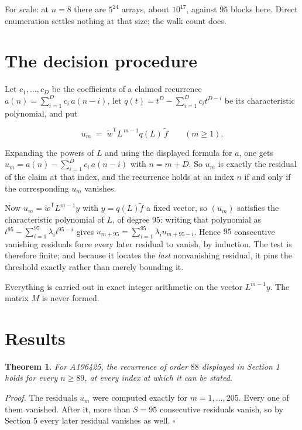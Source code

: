 \documentclass[11pt]{article}
\newtheorem{theorem}{Theorem}
\theoremstyle{definition}
\begin{document}
For scale: at $n = 8$ there are $5^{24}$ arrays, about $10^{17}$, against $95$ blocks here. Direct enumeration settles nothing at that size; the walk count does.

\section{The decision procedure}

Let $c_1,\dots,c_D$ be the coefficients of a claimed recurrence $a(n) = \sum_{i=1}^{D} c_i\,a(n-i)$, let $q(t) = t^{D} - \sum_{i=1}^{D} c_i t^{D-i}$ be its characteristic polynomial, and put

\[u_m \;=\; \tilde w^{\mathsf T} L^{\,m-1} q(L)\,\tilde f \qquad (m \ge 1).\]

Expanding the powers of $L$ and using the displayed formula for $a$, one gets $u_m = a(n) - \sum_{i=1}^{D} c_i\,a(n-i)$ with $n = m + D$. So $u_m$ is exactly the residual of the claim at that index, and the recurrence holds at an index $n$ if and only if the corresponding $u_m$ vanishes.

Now $u_m = \tilde w^{\mathsf T} L^{m-1} y$ with $y = q(L)\tilde f$ a fixed vector, so $(u_m)$ satisfies the characteristic polynomial of $L$, of degree $95$: writing that polynomial as $t^{95} - \sum_{i=1}^{95} \lambda_i t^{95-i}$ gives $u_{m+95} = \sum_{i=1}^{95} \lambda_i u_{m+95-i}$. Hence $95$ consecutive vanishing residuals force every later residual to vanish, by induction. The test is therefore finite; and because it locates the {\itshape last} nonvanishing residual, it pins the threshold exactly rather than merely bounding it.

Everything is carried out in exact integer arithmetic on the vector $L^{m-1}y$. The matrix $M$ is never formed.

\section{Results}

\begin{theorem} For A196425, the recurrence of order $88$ displayed in Section 1 holds for every $n \ge 89$, at every index at which it can be stated.\end{theorem}

{\itshape Proof.} The residuals $u_m$ were computed exactly for $m = 1,\dots,205$. Every one of them vanished. After it, more than $S = 95$ consecutive residuals vanish, so by Section 5 every later residual vanishes as well. $\square$
\end{document}
